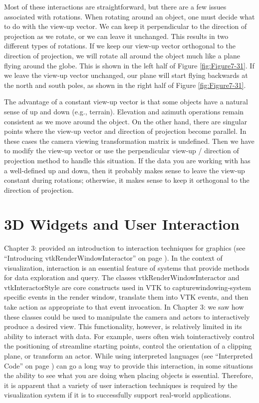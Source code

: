 Most of these interactions are straightforward, but there are a few issues associated with rotations. When rotating around an object, one must decide what to do with the view-up vector. We can keep it perpendicular to the direction of projection as we rotate, or we can leave it unchanged. This results in two different types of rotations. If we keep our view-up vector orthogonal to the direction of projection, we will rotate all around the object much like a plane flying around the globe. This is shown in the left half of Figure \ref{fig:Figure7-31}. If we leave the view-up vector unchanged, our plane will start flying backwards at the north and south poles, as shown in the right half of Figure \ref{fig:Figure7-31}.

The advantage of a constant view-up vector is that some objects have a natural sense of up and down (e.g., terrain). Elevation and azimuth operations remain consistent as we move around the object. On the other hand, there are singular points where the view-up vector and direction of projection become parallel. In these cases the camera viewing transformation matrix is undefined. Then we have to modify the view-up vector or use the perpendicular view-up / direction of projection method to handle this situation. If the data you are working with has a well-defined up and down, then it probably makes sense to leave the view-up constant during rotations; otherwise, it makes sense to keep it orthogonal to the direction of projection.


\section{3D Widgets and User Interaction}
\label{sec:3D_widgets_user_interaction}

Chapter 3:  provided an introduction to interaction techniques for graphics (see ``Introducing vtkRenderWindowInteractor'' on page \pageref{subsec:introducing_vtkRenderWindowInteractor} ).
In the context of visualization, interaction is an essential feature of systems that provide methods for data exploration and query. The classes
vtkRenderWindowInteractor and vtkInteractorStyle are core constructs used in VTK to capturewindowing-system specific events in the render window, translate them into VTK events, and then take action as appropriate to that event invocation.
In Chapter 3:  we saw how these classes could be used to manipulate the camera and actors to interactively produce a desired view. This functionality, however, is relatively limited in its ability to interact with data. For example, users often wish tointeractively control the positioning of streamline starting points, control the orientation of a clipping plane, or transform an actor. While using interpreted languages (see ``Interpreted Code'' on page \pageref{subsec:interpreted_code} ) can go a long way to provide this interaction, in some situations the ability to see what you are doing when placing objects is essential. Therefore, it is apparent that a variety of user interaction techniques is required by the visualization system if it is to successfully support real-world applications.

